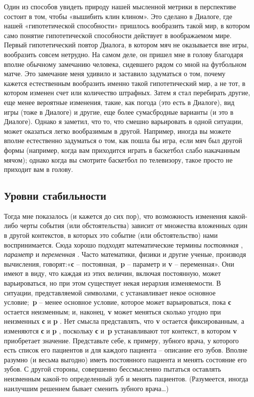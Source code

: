 \documentclass[../main.tex]{subfiles}
\begin{document}
Один из способов увидеть природу нашей мысленной метрики в перспективе состоит в том, чтобы «вышибить клин клином». Это сделано в Диалоге, где нашей «гипотетической способности» пришлось вообразить такой мир, в котором само понятие гипотетической способности действует в воображаемом мире. Первый гипотетический повтор Диалога, в котором мяч не оказывается вне игры, вообразить совсем нетрудно. На самом деле, он пришел мне в голову благодаря вполне обычному замечанию человека, сидевшего рядом со мной на футбольном матче. Это замечание меня удивило и заставило задуматься о том, почему кажется естественным вообразить именно такой гипотетический мир, а не тот, в котором изменен счет или количество штрафных. Затем я стал перебирать другие, еще менее вероятные изменения, такие, как погода (это есть в Диалоге), вид игры (тоже в Диалоге) и другие, еще более сумасбродные варианты (и это в Диалоге). Однако я заметил, что то, что смешно варьировать в одной ситуации, может оказаться легко вообразимым в другой. Например, иногда вы можете вполне естественно задуматься о том, как пошла бы игра, если мяч был другой формы (например, когда вам приходится играть в баскетбол слабо накачанным мячом); однако когда вы смотрите баскетбол по телевизору, такое просто не приходит вам в голову.


\subsection{Уровни стабильности}

Тогда мне показалось (и кажется до сих пор), что возможность изменения какой-либо черты события (или обстоятельства) зависит от множества вложенных один в другой контекстов, в которых это событие (или обстоятельство) нами воспринимается. Сюда хорошо подходят математические термины \emph{постоянная} , \emph{параметр} и \emph{переменная} . Часто математики, физики и другие ученые, производя вычисления, говорят:«\textbf{с} \--- постоянная,~\textbf{p} \--- параметр и \textbf{v} \--- переменная». Они имеют в виду, что каждая из этих величин, включая постоянную, может варьироваться, но при этом существует некая иерархия изменяемости. В ситуации, представляемой символами, с устанавливает некое основное условие;~\textbf{p} \--- менее основное условие, которое может варьироваться, пока \textbf{с} остается неизменным; и, наконец, \textbf{v} может меняться сколько угодно при неизменных \textbf{с} и \textbf{p} . Нет смысла представлять, что \textbf{v} остается фиксированным, а изменяются \textbf{с} и \textbf{p} , поскольку \textbf{с} и~\textbf{p} устанавливают тот контекст, в котором \textbf{v} приобретает значение. Представьте себе, к примеру, зубного врача, у которого есть список его пациентов и для каждого пациента \--- описание его зубов. Вполне разумно (и весьма выгодно) иметь постоянного пациента и менять состояние его зубов. С другой стороны, совершенно бессмысленно пытаться оставлять неизменным какой-то определенный зуб и менять пациентов. (Разумеется, иногда наилучшим решением бывает сменить зубного врача\ldots)
\end{document}
